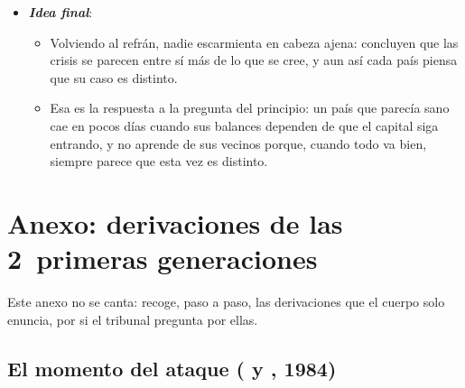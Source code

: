 \documentclass[11pt]{article}
\begin{document}
\begin{itemize}
\begin{itemize}
  \item Por eso la mejor defensa no es un modelo, sino una política coherente con el régimen cambiario, un sistema financiero bien supervisado, balances sanos (poca deuda a corto plazo y en divisas) y reservas suficientes.
  \end{itemize}
\item \textbf{\emph{Idea final}}:
  \begin{itemize}
  \item Volviendo al refrán, nadie escarmienta en cabeza ajena: \textcite{ReinhartRogoff2009This} concluyen que las crisis se parecen entre sí más de lo que se cree, y aun así cada país piensa que su caso es distinto.
  \item Esa es la respuesta a la pregunta del principio: un país que parecía sano cae en pocos días cuando sus balances dependen de que el capital siga entrando, y no aprende de sus vecinos porque, cuando todo va bien, siempre parece que esta vez es distinto.
  \end{itemize}
\end{itemize}

\clearpage
\appendix

\section{Anexo: derivaciones de las 2~primeras generaciones}\label{anexo:derivaciones}

Este anexo no se canta: recoge, paso a paso, las derivaciones que el cuerpo solo enuncia, por si el tribunal pregunta por ellas.

\subsection{El momento del ataque ( y , 1984)}\label{anexo:momento-ataque}
\end{document}
